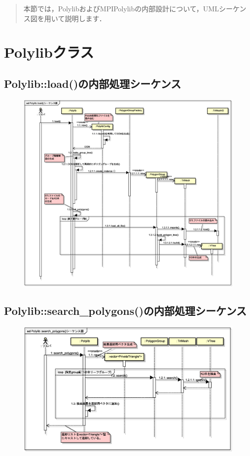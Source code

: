 {\begin{abstract}
本節では，PolylibおよびMPIPolylibの内部設計について，UMLシーケンス図を用いて説明します．
\end{abstract}
%

\graphicspath{{./fig_design/}}

%
\section{Polylibクラス}

%
\subsection{Polylib::load()の内部処理シーケンス}

\begin{figure}[H]
 \centering
 \includegraphics[width=16cm]{clip012.eps}
\end{figure}


\pagebreak
%
\subsection{Polylib::search\_polygons()の内部処理シーケンス}

\begin{figure}[H]
 \centering
 \includegraphics[width=15cm]{clip013.eps}
\end{figure}


}
